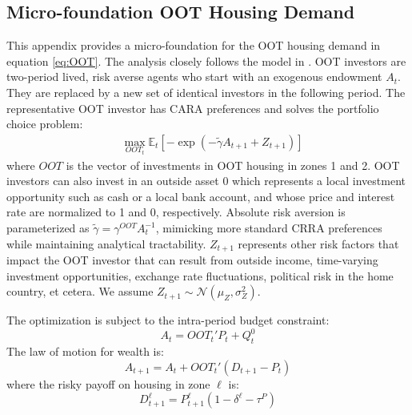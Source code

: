 \documentclass[letterpaper,12pt,dvipsnames,usenames]{article}
\newcommand{\E}{\mathbb{E}}
\theoremstyle{definition}
\begin{document}
\begin{spacing}{1.0}
%
%








\newpage

\appendix

\begin{small}

\section{Micro-foundation OOT Housing Demand}\label{app:OOTfoundation}

This appendix provides a micro-foundation for the OOT housing demand in equation \eqref{eq:OOT}. The analysis closely follows the model in \citet{KRY:19}. OOT investors are two-period lived, risk averse agents who start with an exogenous endowment  $A_{t}$. They are replaced by a new set of identical investors in the following period. The representative OOT investor has CARA preferences and solves the portfolio choice problem:
\begin{eqnarray*}&
\max_{OOT_t} \E_t [-\exp(-\tilde \gamma A_{t+1} + Z_{t+1})]
\end{eqnarray*}
where $OOT$ is the vector of investments in OOT housing in zones 1 and 2. OOT investors can also invest in an outside asset 0 which represents a local investment opportunity such as cash or a local bank account, and whose price and interest rate are normalized to 1 and 0, respectively. Absolute risk aversion is parameterized as $\tilde \gamma = \gamma^{OOT}A_t^{-1}$, mimicking more standard CRRA preferences while maintaining analytical tractability. $Z_{t+1}$ represents other risk factors that impact the OOT investor that can result from outside income, time-varying investment opportunities, exchange rate fluctuations, political risk in the home country, et cetera. We assume $Z_{t+1} \sim \mathcal{N}(\mu_Z,\sigma^2_Z)$.

The optimization is subject to the intra-period budget constraint:
\[ A_t = OOT_t'P_t + Q^0_t  \]
The law of motion for wealth is:
\[A_{t+1} = A_t + OOT_t'(D_{t+1}-P_t)\]
where the risky payoff on housing in zone $\ell$  is:
\[D_{t+1}^{\ell} = P_{t+1}^{\ell}(1-\delta^{\ell}-\tau^P)\]


\end{small}
\end{spacing}
\end{document}

